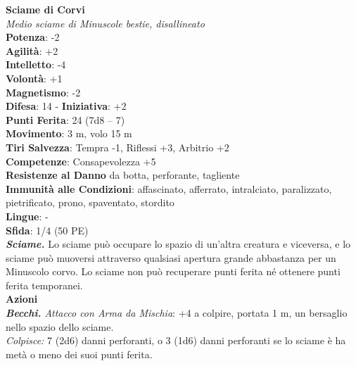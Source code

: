 \begin{multicols}{2}
\medskip\textbf{Sciame di Corvi}\\
\emph{Medio sciame di Minuscole bestie, disallineato}\\
\textbf{Potenza}: -2\\
\textbf{Agilità}: +2\\
\textbf{Intelletto}: -4\\
\textbf{Volontà}: +1\\
\textbf{Magnetismo}: -2\\
\textbf{Difesa}: 14 - \textbf{Iniziativa}: +2\\
\textbf{Punti Ferita}: 24 (7d8 -- 7)\\
\textbf{Movimento}: 3 m, volo 15 m\\
\textbf{Tiri Salvezza}: Tempra -1, Riflessi +3, Arbitrio +2\\
\textbf{Competenze}: Consapevolezza +5\\
\textbf{Resistenze al Danno} da botta, perforante, tagliente \\
\textbf{Immunità alle Condizioni}: affascinato, afferrato, intralciato, paralizzato, pietrificato, prono, spaventato, stordito\\
\textbf{Lingue}: -\\
\textbf{Sfida}: 1/4 (50 PE)\smallskip\\
\emph{\textbf{Sciame.}} Lo sciame può occupare lo spazio di un'altra creatura e viceversa, e lo sciame può muoversi attraverso qualsiasi apertura grande abbastanza per un Minuscolo corvo. Lo sciame non può recuperare punti ferita né ottenere punti ferita temporanei.\\
\smallskip\textbf{Azioni}\\
\emph{\textbf{Becchi.} Attacco con Arma da Mischia}: +4 a colpire, portata 1 m, un bersaglio nello spazio dello sciame.\\
\emph{Colpisce:} 7 (2d6) danni perforanti, o 3 (1d6) danni perforanti se lo sciame è ha metà o meno dei suoi punti ferita.\\


\end{multicols}
